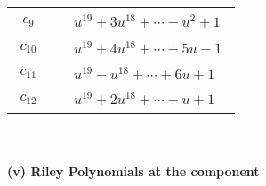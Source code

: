 \documentclass[1p]{elsarticle_modified}
\theoremstyle{definition}
\begin{document}
\begin{tabular}{m{50pt}|m{274pt}}
\hline $$\begin{aligned}c_{9}\end{aligned}$$&$\begin{aligned}
&u^{19}+3 u^{18}+\cdots- u^2+1
\end{aligned}$\\
\hline $$\begin{aligned}c_{10}\end{aligned}$$&$\begin{aligned}
&u^{19}+4 u^{18}+\cdots+5 u+1
\end{aligned}$\\
\hline $$\begin{aligned}c_{11}\end{aligned}$$&$\begin{aligned}
&u^{19}- u^{18}+\cdots+6 u+1
\end{aligned}$\\
\hline $$\begin{aligned}c_{12}\end{aligned}$$&$\begin{aligned}
&u^{19}+2 u^{18}+\cdots- u+1
\end{aligned}$\\
\hline
\end{tabular}\\~\\
\newpage\renewcommand{\arraystretch}{1}
\flushleft \textbf{(v) Riley Polynomials at the component}\newline \\
\end{document}
